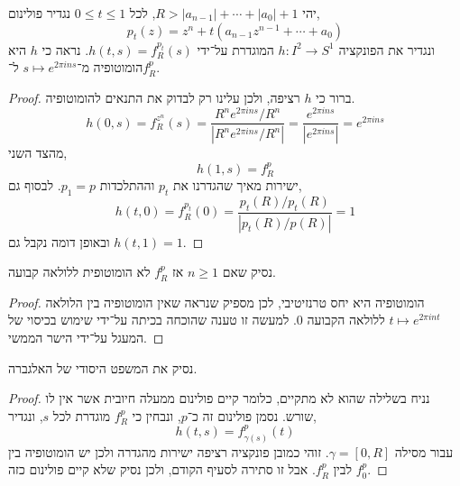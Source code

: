 \subquestion{}
יהי $R > |a_{n - 1}| + \cdots + |a_0| + 1$,
לכל $0 \le t \le 1$ נגדיר פולינום,
\[
	p_t(z)
	= z^n + t(a_{n - 1} z^{n - 1} + \cdots + a_0)
\]
ונגדיר את הפונקציה $h : I^2 \to S^1$ המוגדרת על־ידי $h(t, s) = f_R^{p_t}(s)$.
נראה כי $h$ היא הומוטופיה מ־$s \mapsto e^{2 \pi i n s}$ ל־$f_R^p$.
\begin{proof}
	ברור כי $h$ רציפה, ולכן עלינו רק לבדוק את התנאים להומוטופיה.
	\[
		h(0, s)
		= f_R^{z^n}(s)
		= \frac{R^n e^{2 \pi i n s} / R^n}{|R^n e^{2 \pi i n s} / R^n|}
		= \frac{e^{2 \pi i n s}}{|e^{2 \pi i n s}|}
		= e^{2 \pi i n s}
	\]
	מהצד השני,
	\[
		h(1, s)
		= f_R^p
	\]
	ישירות מאיך שהגדרנו את $p_t$ וההתלכדות $p_1 = p$.
	לבסוף גם,
	\[
		h(t, 0)
		= f_R^{p_t}(0)
		= \frac{p_t(R) / p_t(R)}{|p_t(R) / p(R)|}
		= 1
	\]
	ובאופן דומה נקבל גם $h(t, 1) = 1$.
\end{proof}

\subquestion{}
נסיק שאם $n \ge 1$ אז $f_R^p$ לא הומוטופית ללולאה קבועה.
\begin{proof}
	הומוטופיה היא יחס טרנזיטיבי, לכן מספיק שנראה שאין הומוטופיה בין הלולאה $t \mapsto e^{2 \pi i n t}$ ללולאה הקבועה $0$.
	למעשה זו טענה שהוכחה בכיתה על־ידי שימוש בכיסוי של המעגל על־ידי הישר הממשי.
\end{proof}

\subquestion{}
נסיק את המשפט היסודי של האלגברה.
\begin{proof}
	נניח בשלילה שהוא לא מתקיים, כלומר קיים פולינום ממעלה חיובית אשר אין לו שורש.
	נסמן פולינום זה כ־$p$, ונבחין כי $f_R^p$ מוגדרת לכל $s$, ונגדיר,
	\[
		h(t, s)
		= f_{\gamma(s)}^p(t)
	\]
	עבור מסילה $\gamma = [0, R]$.
	זוהי כמובן פונקציה רציפה ישירות מהגדרה ולכן יש הומוטופיה בין $f_0^p$ לבין $f_R^p$.
	אבל זו סתירה לסעיף הקודם, ולכן נסיק שלא קיים פולינום כזה.
\end{proof}


